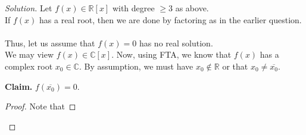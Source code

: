 \documentclass[12pt]{article}
\theoremstyle{definition}
\newenvironment{blockquote}
{\begin{mdframed}[skipabove=0pt, skipbelow=0pt, innertopmargin=4pt, innerbottommargin=4pt, bottomline=false,topline=false,rightline=false, linewidth=2pt]}
{\end{mdframed}}
\newenvironment{soln}{\begin{proof}[Solution]}{\end{proof}}
\begin{document}
\begin{enumerate}
	\begin{soln}
		Let $f(x) \in \mathbb{R}[x]$ with degree $\ge 3$ as above.\\
		If $f(x)$ has a real root, then we are done by factoring as in the earlier question.\\~\\
		Thus, let us assume that $f(x) = 0$ has no real solution.\\
		We may view $f(x) \in \mathbb{C}[x].$ Now, using FTA, we know that $f(x)$ has a complex root $x_0 \in \mathbb{C}.$ By assumption, we must have $x_0 \notin \mathbb{R}$ or that $x_0 \neq \overline{x_0}.$ \\
		\begin{blockquote}
			\textbf{Claim.} $f(\overline{x_0}) = 0.$
			\begin{proof} 
				Note that


\end{proof}
\end{blockquote}
\end{soln}
\end{enumerate}
\end{document}
